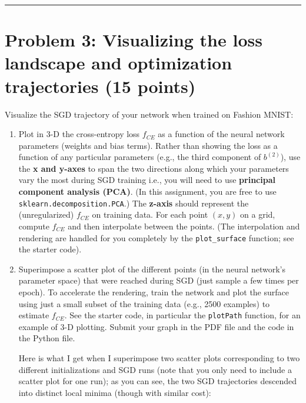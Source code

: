 \documentclass[
  letterpaper,
  DIV=11,
  numbers=noendperiod]{scrartcl}
\begin{document}
\begin{center}\rule{0.5\linewidth}{0.5pt}\end{center}

\section{Problem 3: Visualizing the loss landscape and optimization
trajectories (15
points)}\label{problem-3-visualizing-the-loss-landscape-and-optimization-trajectories-15-points}

Visualize the SGD trajectory of your network when trained on Fashion
MNIST:

\begin{enumerate}
\def\labelenumi{\arabic{enumi}.}
\item
  Plot in 3-D the cross-entropy loss \(f_{CE}\) as a function of the
  neural network parameters (weights and bias terms). Rather than
  showing the loss as a function of any particular parameters (e.g., the
  third component of \(b^{(2)}\)), use the \textbf{x and y-axes} to span
  the two directions along which your parameters vary the most during
  SGD training i.e., you will need to use \textbf{principal component
  analysis (PCA)}. (In this assignment, you are free to use
  \texttt{sklearn.decomposition.PCA}.) The \textbf{z-axis} should
  represent the (unregularized) \(f_{CE}\) on training data. For each
  point \((x,y)\) on a grid, compute \(f_{CE}\) and then interpolate
  between the points. (The interpolation and rendering are handled for
  you completely by the \texttt{plot\_surface} function; see the starter
  code).
\item
  Superimpose a scatter plot of the different points (in the neural
  network's parameter space) that were reached during SGD (just sample a
  few times per epoch). To accelerate the rendering, train the network
  and plot the surface using just a small subset of the training data
  (e.g., 2500 examples) to estimate \(f_{CE}\). See the starter code, in
  particular the \texttt{plotPath} function, for an example of 3-D
  plotting. Submit your graph in the PDF file and the code in the Python
  file.

  Here is what I get when I superimpose two scatter plots corresponding
  to two different initializations and SGD runs (note that you only need
  to include a scatter plot for one run); as you can see, the two SGD
  trajectories descended into distinct local minima (though with similar
  cost):
\end{enumerate}
\end{document}
